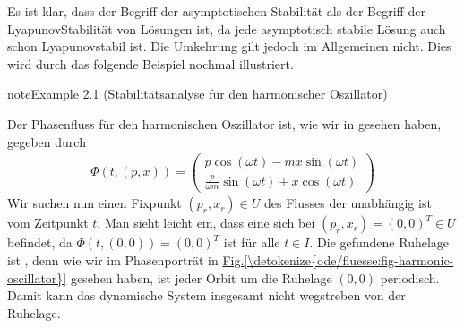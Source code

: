 \documentclass[letterpaper,10pt,english]{jupyterBook}
\begin{document}
\sphinxAtStartPar
Es ist klar, dass der Begriff der asymptotischen Stabilität  als der Begriff der Lyapunov\sphinxhyphen{}Stabilität von Lösungen ist, da jede asymptotisch stabile Lösung auch schon Lyapunov\sphinxhyphen{}stabil ist.
Die Umkehrung gilt jedoch im Allgemeinen nicht.
Dies wird durch das folgende Beispiel nochmal illustriert.
\label{odestability/stabilitaetsbegriffe:example-1}
\begin{sphinxadmonition}{note}{Example 2.1 (Stabilitätsanalyse für den harmonischer Oszillator)}



\sphinxAtStartPar
Der Phasenfluss für den harmonischen Oszillator ist, wie wir in {\hyperref[\detokenize{ode/fluesse:ex:oscillations}]{}} gesehen haben, gegeben durch
\begin{equation*}
\begin{split}\Phi(t, (p,x)) = \begin{pmatrix}
p \cos(\omega t) - m x \sin(\omega t)\\
\frac{p}{\omega m}\sin(\omega t) + x\cos(\omega t)
\end{pmatrix}\end{split}
\end{equation*}
\sphinxAtStartPar
Wir suchen nun einen Fixpunkt \((p_r,x_r) \in U\) des Flusses der unabhängig ist vom Zeitpunkt \(t\).
Man sieht leicht ein, dass eine  sich bei \((p_r,x_r) = (0,0)^T \in U\) befindet, da \(\Phi(t,(0,0)) = (0,0)^T\) ist für alle \(t \in I\).
Die gefundene Ruhelage ist , denn wie wir im Phasenporträt in \hyperref[\detokenize{ode/fluesse:fig-harmonic-oscillator}]{Fig.\@ \ref{\detokenize{ode/fluesse:fig-harmonic-oscillator}}} gesehen haben, ist jeder Orbit um die Ruhelage \((0,0)\) periodisch. Damit kann das dynamische System insgesamt nicht wegstreben von der Ruhelage.


\end{sphinxadmonition}
\end{document}

